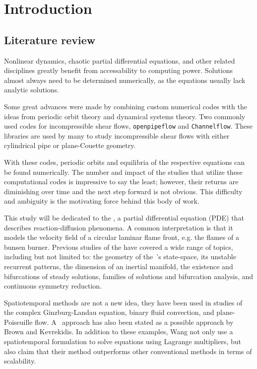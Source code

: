\newpage
\section{Introduction}
\label{section:Introduction}

\subsection{Literature review}
\label{subsection:lit_review}
Nonlinear dynamics, chaotic partial differential equations,
and other related disciplines greatly benefit from accessability to computing power.
Solutions almost always need to be determined numerically, as the equations usually
lack analytic solutions.

Some great advances were made by combining custom numerical codes
with the ideas from periodic orbit theory and dynamical systems theory.
Two commonly used codes for incompressible shear flows, \texttt{openpipeflow} and
\texttt{Channelflow}. These libraries are used by many to study incompressible
shear flows with either cylindrical pipe or plane-Couette geometry.

With these codes, periodic orbits and
equilibria of the respective equations can be found numerically.
The number and impact of the studies that utilize these computational codes
is impressive to say the least; however, their returns are diminishing
over time and the next step forward is not obvious. This difficulty and ambiguity
is the motivating force behind this body of work.

This study will be dedicated to the \KSe{}, a partial differential equation (PDE)
that describes reaction-diffusion phenomena.
A common interpretation is that it models the velocity field
of a circular laminar flame front, e.g. the flames of a bunsen burner.
Previous studies of the \KSe{} have covered a wide range of topics, including
but not limited to: the geometry of the \KSe\,'s
state-space, its unstable recurrent patterns,
the dimension of an inertial manifold,
the existence and bifurcations of steady solutions,
families of solutions and bifurcation analysis, and
continuous symmetry reduction.

Spatiotemporal methods are not a new idea, they have been used in studies of
the complex Ginzburg-Landau equation,
binary fluid convection, and plane-Poiseuille flow.
A \spt\ approach has also been stated as a possible approach by Brown and
Kevrekidis.
In addition to these examples, Wang \etal{} not only use a spatiotemporal formulation
to solve equations using Lagrange multipliers, but also claim that their
method outperforms other conventional methods in terms of scalability.

